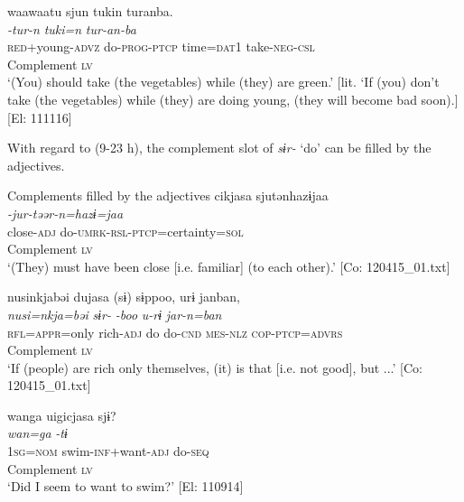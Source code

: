 \ex \label{ex:9.31b} %
    \gllll  waawaatu  sjun  tukin  turanba.\\
      \textit{}  \textit{-tur-n}  \textit{tuki=n}  \textit{tur-an-ba}\\
      \textsc{red}+young-\textsc{advz}  do-\textsc{prog}-\textsc{ptcp}  time=\textsc{dat}1  take-\textsc{neg}-\textsc{csl}\\
      Complement  \textsc{lv}\\
      \glt  ‘(You) should take (the vegetables) while (they) are green.’ [lit. ‘If (you) don’t take (the vegetables) while (they) are doing young, (they will become bad soon).] [El: 111116]
    \z
\z

With regard to (9-23 h), the complement slot of \textit{sɨr-} ‘do’ can be filled by the adjectives.

\ea   Complements filled by the adjectives \label{ex:9.32}
\ea %
 \gllll  cikjasa  sjutənhazɨjaa\\
      \textit{}  \textit{-jur-təər-n=hazɨ=jaa}\\
      close-\textsc{adj}  do-\textsc{umrk}-\textsc{rsl}-\textsc{ptcp}=certainty=\textsc{sol}\\
      Complement  \textsc{lv}\\
      \glt       ‘(They) must have been close [i.e. familiar] (to each other).’ [Co: 120415\_01.txt]

\ex \label{ex:9.32b} %
    \gllll  nusinkjabəi  dujasa  (sɨ)  sɨppoo,  urɨ  janban,\\
      \textit{nusi=nkja=bəi}  \textit{}  \textit{sɨr-}  \textit{-boo}  \textit{u-rɨ}  \textit{jar-n=ban}\\
      \textsc{rfl}=\textsc{appr}=only  rich-\textsc{adj}  do  do-\textsc{cnd}  \textsc{mes}-\textsc{nlz}  \textsc{cop}-\textsc{ptcp}=\textsc{advrs}\\
       {} Complement    \textsc{lv}    \\
      \glt       ‘If (people) are rich only themselves, (it) is that [i.e. not good], but ...’ [Co: 120415\_01.txt]

\ex \label{ex:9.32c} %
    \gllll  wanga  uigicjasa  sjɨ?\\
      \textit{wan=ga}  \textit{}  \textit{-tɨ}\\
      1\textsc{sg}=\textsc{nom}  swim-\textsc{inf}+want-\textsc{adj}  do-\textsc{seq}\\
      {}  Complement  \textsc{lv}\\
      \glt       ‘Did I seem to want to swim?’ [El: 110914]
    \z
\z


